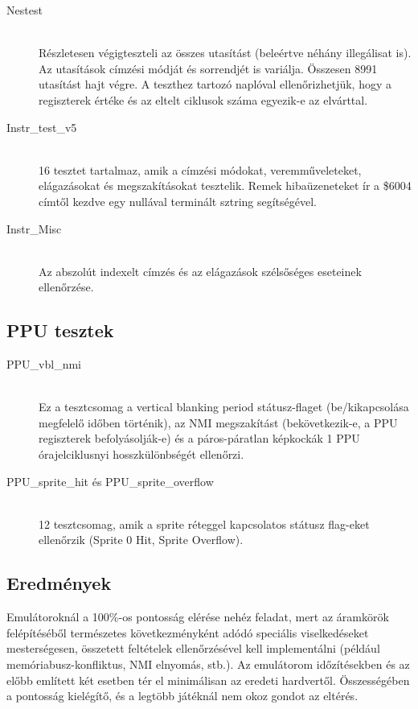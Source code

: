\begin{description}
\item[Nestest] \hfill \\
Részletesen végigteszteli az összes utasítást (beleértve néhány illegálisat is). Az utasítások címzési módját és sorrendjét is variálja. Összesen 8991 utasítást hajt végre. A teszthez tartozó naplóval ellenőrizhetjük, hogy a regiszterek értéke és az eltelt ciklusok száma egyezik-e az elvárttal. 

\item[Instr\_test\_v5] \hfill \\
16 tesztet tartalmaz, amik a címzési módokat, veremműveleteket, elágazásokat és megszakításokat tesztelik. Remek hibaüzeneteket ír a \$6004 címtől kezdve egy nullával terminált sztring segítségével.

\item[Instr\_Misc] \hfill \\
Az abszolút indexelt címzés és az elágazások szélsőséges eseteinek ellenőrzése.

\end{description}

\subsection{PPU tesztek}

\begin{description}
\item[PPU\_vbl\_nmi] \hfill \\
Ez a tesztcsomag a vertical blanking period státusz-flaget (be/kikapcsolása megfelelő időben történik), az NMI megszakítást (bekövetkezik-e, a PPU regiszterek befolyásolják-e) és a páros-páratlan képkockák 1 PPU órajelciklusnyi hosszkülönbségét ellenőrzi.

\item[PPU\_sprite\_hit és PPU\_sprite\_overflow] \hfill \\
12 tesztcsomag, amik a sprite réteggel kapcsolatos státusz flag-eket ellenőrzik (Sprite 0 Hit, Sprite Overflow).

\end{description}

\subsection{Eredmények}

Emulátoroknál a 100\%-os pontosság elérése nehéz feladat, mert az áramkörök felépítéséből természetes következményként adódó speciális viselkedéseket mesterségesen, összetett feltételek ellenőrzésével kell implementálni (például memóriabusz-konfliktus, NMI elnyomás, stb.).  Az emulátorom időzítésekben és az előbb említett két esetben tér el minimálisan az eredeti hardvertől. Összességében a pontosság kielégítő, és a legtöbb játéknál nem okoz gondot az eltérés.

